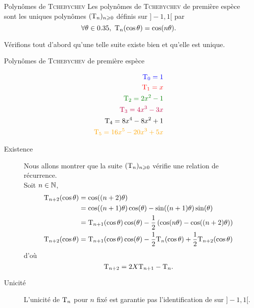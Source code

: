 \begin{defi}{Polynômes de \textsc{Tchebychev}}
    Les polynômes de \textsc{Tchebychev} de première espèce sont les uniques polynômes $(\mathrm{T}_n)_{n \geqslant 0}$ définis sur $]-1, 1[$ par
    $$\forall \theta \in 0.35,\ \mathrm{T}_n (\cos \theta) = \cos(n \theta).$$
\end{defi}

Vérifions tout d'abord qu'une telle suite existe bien et qu'elle est unique.

\begin{marginfigure}[-4.5cm]
    \centering
	
	\caption*{\centering Polynômes de \textsc{Tchebychev} de première espèce}
	\begin{align*}
	   	\color{blue} \Tcheby_0 = 1 \\
    	\color{red} \Tcheby_1 = x \\
    	\color{green} \Tcheby_2 = 2x^2-1 \\
    	\color{purple} \Tcheby_3 = 4x^3-3x \\
    	\color{black} \Tcheby_4 = 8x^4-8x^2+1 \\
    	\color{orange} \Tcheby_5 = 16x^5-20x^3+5x
	\end{align*}
\end{marginfigure}

\begin{preuve}
    \begin{description}
        \item[Existence] Nous allons montrer que la suite $(\mathrm{T}_n)_{n \geqslant 0}$ vérifie une relation de récurrence. \\
        Soit $n \in \mathbb{N}$,
        \begin{align*}
            \mathrm{T}_{n+2}(\cos \theta) &= \cos((n+2) \theta) \\
            &= \cos((n+1) \theta) \cos(\theta) - \sin((n+1) \theta) \sin(\theta) \\
            &= \mathrm{T}_{n+1}(\cos \theta) \cos(\theta) - \frac{1}{2} \left(\cos(n \theta) - \cos((n+2)\theta)\right) \\
            \mathrm{T}_{n+2}(\cos \theta) &= \mathrm{T}_{n+1}(\cos \theta) \cos(\theta) - \frac{1}{2} \mathrm{T}_n(\cos \theta) + \frac{1}{2} \mathrm{T}_{n+2}(\cos \theta)
        \end{align*}
        d'où
        $$\mathrm{T}_{n+2} = 2X \mathrm{T}_{n+1} - \mathrm{T}_n.$$
        \item[Unicité] L'unicité de $\mathrm{T}_n$ pour $n$ fixé est garantie pas l'identification de  sur $]-1, 1[$. 
    \end{description}
\end{preuve}

